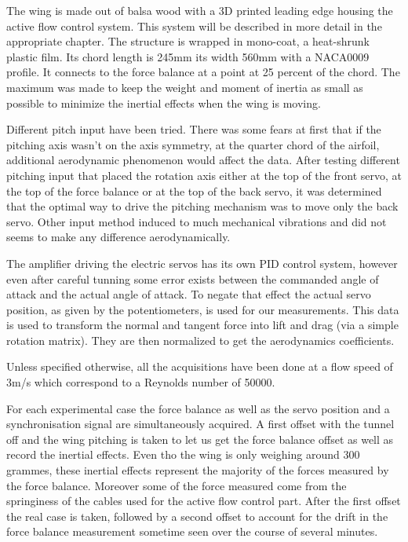 \par The wing is made out of balsa wood with a 3D printed leading edge housing the active flow control system.
This system will be described in more detail in the appropriate chapter.
The structure is wrapped in mono-coat, a heat-shrunk plastic film.
Its chord length is 245mm its width 560mm with a NACA0009 profile.
It connects to the force balance at a point at 25 percent of the chord.
The maximum was made to keep the weight and moment of inertia as small as possible to minimize the inertial effects when the wing is moving.

Different pitch input have been tried.
There was some fears at first that if the pitching axis wasn't on the axis symmetry, at the quarter chord of the airfoil, additional aerodynamic phenomenon would affect the data.
After testing different pitching input that placed the rotation axis either at the top of the front servo, at the top of the force balance or at the top of the back servo,  it was determined that the optimal way to drive the pitching mechanism was to move only the back servo.
Other input method induced to much mechanical vibrations and did not seems to make any difference aerodynamically.

\par The amplifier driving the electric servos has its own PID control system, however even after careful tunning some error exists between the commanded angle of attack and the actual angle of attack.
To negate that effect the actual servo position, as given by the potentiometers, is used for our measurements.
This data is used to transform the normal and tangent force into lift and drag (via a simple rotation matrix). 
They are then normalized to get the aerodynamics coefficients.

\par Unless specified otherwise, all the acquisitions have been done at a flow speed of 3m/s which correspond to a Reynolds number of 50000.

\par For each experimental case the force balance as well as the servo position and a synchronisation signal are simultaneously acquired.
A first offset with the tunnel off and the wing pitching is taken to let us get the force balance offset as well as record the inertial effects.
Even tho the wing is only weighing around 300 grammes, these inertial effects represent the majority of the forces measured by the force balance.
Moreover some of the force measured come from the springiness of the cables used for the active flow control part.
After the first offset the real case is taken, followed by a second offset to account for the drift in the force balance measurement sometime seen over the course of several minutes.

